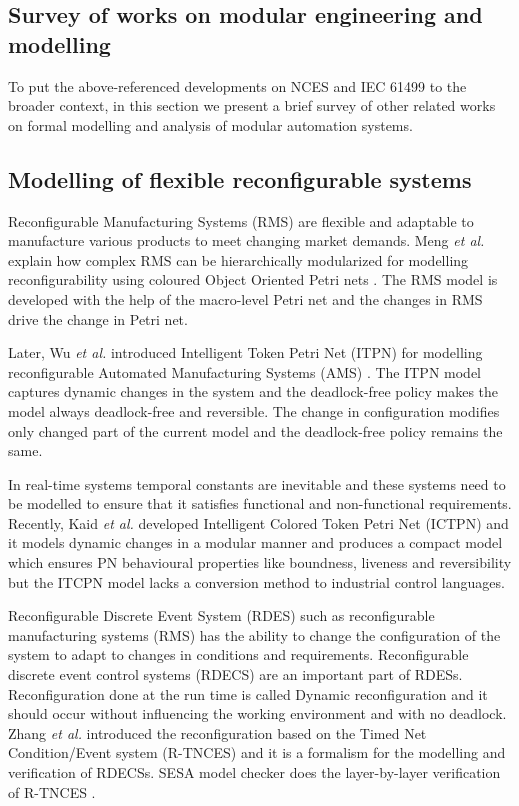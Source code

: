 \begin{bibunit}
\section{Survey of works on modular engineering and modelling}\label{sec:survey}

To put the above-referenced developments on NCES and IEC 61499 to the broader context, in this section we present a brief survey of other related works on formal modelling and analysis of modular automation systems. 

\subsection{Modelling of flexible reconfigurable systems}

Reconfigurable Manufacturing Systems (RMS) are flexible and adaptable to manufacture various products to meet changing market demands. Meng \textit{et al.} explain how complex RMS can be hierarchically modularized for modelling reconfigurability using coloured Object Oriented Petri nets \cite{MENG201081}. The  RMS model is developed with the help of the macro-level Petri net and the changes in RMS drive the change in Petri net.

Later,  Wu \textit{et al.} introduced Intelligent Token Petri Net (ITPN) for modelling reconfigurable Automated Manufacturing Systems (AMS) \cite{wu2011intelligent}. The ITPN model captures dynamic changes in the system and the deadlock-free policy makes the model always deadlock-free and reversible. The change in configuration modifies only changed part of the current model and the deadlock-free policy remains the same.

In real-time systems temporal constants are inevitable and these systems need to be modelled to ensure that it satisfies functional and non-functional requirements. Recently, Kaid \textit{et al.} developed  Intelligent Colored Token Petri Net (ICTPN) and it models dynamic changes in a modular manner and produces a compact model which ensures PN behavioural properties like boundness, liveness and reversibility but the ITCPN model lacks a conversion method to industrial control languages.

Reconfigurable Discrete Event System (RDES) such as reconfigurable manufacturing systems (RMS) has the ability to change the configuration of the system to adapt to changes in conditions and requirements.
Reconfigurable discrete event control systems  (RDECS) are an important part of RDESs.  Reconfiguration done at the run time is called Dynamic reconfiguration and it should occur without influencing the working environment and with no deadlock. Zhang \textit{et al.} introduced the reconfiguration based on the Timed Net Condition/Event system (R-TNCES) and it is a formalism for the modelling and verification of RDECSs. SESA model checker does the layer-by-layer verification of R-TNCES \cite{zhang2013r}.  


\end{bibunit}
